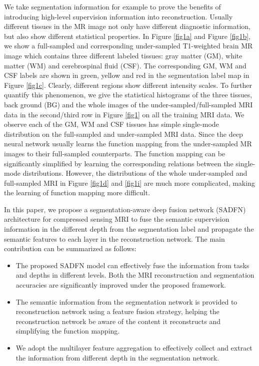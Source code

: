 \documentclass[runningheads]{llncs}
\begin{document}
We take segmentation information for example to prove the benefits of introducing high-level supervision information into reconstruction. Usually different tissues in the MR image not only have different diagnostic information, but also show different statistical properties. In Figure \ref{fig1a} and Figure \ref{fig1b}, we show a full-sampled and corresponding under-sampled T1-weighted brain MR image which contains three different labeled tissues: gray matter (GM), white matter (WM) and cerebrospinal fluid (CSF). The corresponding GM, WM and CSF labels are shown in green, yellow and red in the segmentation label map in Figure \ref{fig1c}. Clearly, different regions show different intensity scales. To further quantify this phenomenon, we give the statistical histograms of the three tissues, back ground (BG) and the whole images of the under-sampled/full-sampled MRI data in the second/third row in Figure \ref{fig1} on all the training MRI data. We observe each of the GM, WM and CSF tissues has simple single-mode distribution on the full-sampled and under-sampled MRI data. Since the deep neural network usually learns the function mapping from the under-sampled MR images to their full-sampled counterparts. The function mapping can be significantly simplified by learning the corresponding relations between the single-mode distributions. However, the distributions of the whole under-sampled and full-sampled MRI in Figure \ref{fig1d} and \ref{fig1i} are much more complicated, making the learning of function mapping more difficult.

In this paper, we propose a segmentation-aware deep fusion network (SADFN) architecture for compressed sensing MRI to fuse the semantic supervision information in the different depth from the segmentation label and propagate the semantic features to each layer in the reconstruction network. The main contribution can be summarized as follows:
\begin{itemize}
  \item The proposed SADFN model can effectively fuse the information from tasks and depths in different levels. Both the MRI reconstruction and segmentation accuracies are significantly improved under the proposed framework.
  \item The semantic information from the segmentation network is provided to reconstruction network using a feature fusion strategy, helping the reconstruction network be aware of
      the content it reconstructs and simplifying the function mapping.
  \item We adopt the multilayer feature aggregation to effectively collect and extract the information from different depth in the segmentation network.
\end{itemize}
\end{document}
